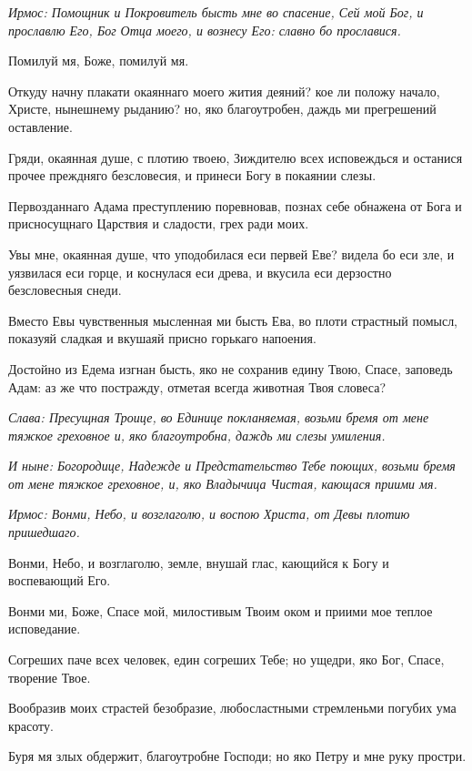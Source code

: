 \itshape Ирмос\normalfont{}: Помощник и Покровитель бысть мне во спасение, Сей мой Бог, и прославлю Его, Бог Отца моего, и вознесу Его: славно бо прославися. 

Помилуй мя, Боже, помилуй мя. 

Откуду начну плакати окаяннаго моего жития деяний? кое ли положу начало, Христе, нынешнему рыданию? но, яко благоутробен, даждь ми прегрешений оставление. 

Гряди, окаянная душе, с плотию твоею, Зиждителю всех исповеждься и останися прочее преждняго безсловесия, и принеси Богу в покаянии слезы. 

Первозданнаго Адама преступлению поревновав, познах себе обнажена от Бога и присносущнаго Царствия и сладости, грех ради моих. 

Увы мне, окаянная душе, что уподобилася еси первей Еве? видела бо еси зле, и уязвилася еси горце, и коснулася еси древа, и вкусила еси дерзостно безсловесныя снеди. 

Вместо Евы чувственныя мысленная ми бысть Ева, во плоти страстный помысл, показуяй сладкая и вкушаяй присно горькаго напоения. 

Достойно из Едема изгнан бысть, яко не сохранив едину Твою, Спасе, заповедь Адам: аз же что постражду, отметая всегда животная Твоя словеса? 

\itshape Слава\normalfont{}: Пресущная Троице, во Единице покланяемая, возьми бремя от мене тяжкое греховное и, яко благоутробна, даждь ми слезы умиления. 

\itshape И ныне\normalfont{}: Богородице, Надежде и Предстательство Тебе поющих, возьми бремя от мене тяжкое греховное, и, яко Владычица Чистая, кающася приими мя. 


\itshape Ирмос\normalfont{}: Вонми, Небо, и возглаголю, и воспою Христа, от Девы плотию пришедшаго. 

Вонми, Небо, и возглаголю, земле, внушай глас, кающийся к Богу и воспевающий Его. 

Вонми ми, Боже, Спасе мой, милостивым Твоим оком и приими мое теплое исповедание. 

Согреших паче всех человек, един согреших Тебе; но ущедри, яко Бог, Спасе, творение Твое. 

Вообразив моих страстей безобразие, любосластными стремленьми погубих ума красоту. 

Буря мя злых обдержит, благоутробне Господи; но яко Петру и мне руку простри. 

